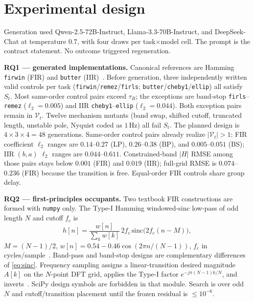 \documentclass{article}
\begin{document}
\section{Experimental design}
\label{sec:design}

Generation used Qwen-2.5-72B-Instruct, Llama-3.3-70B-Instruct,
and DeepSeek-Chat at temperature $0.7$, with four draws per
task$\times$model cell.
The prompt is the contract statement.
No outcome triggered regeneration.

\noindent\textbf{RQ1 --- generated implementations.}
Canonical references are Hamming \texttt{firwin} (FIR) and
\texttt{butter} (IIR)~\cite{virtanen2020scipy}.
Before generation, three independently written valid controls per task
(\texttt{firwin}/\texttt{remez}/\texttt{firls};
\texttt{butter}/\texttt{cheby1}/\texttt{ellip}) all satisfy $S_t$.
Most same-order control pairs exceed $\tau_R$; the exceptions are
band-stop \texttt{firls}--\texttt{remez} ($\ell_2=0.005$) and IIR
\texttt{cheby1}--\texttt{ellip} ($\ell_2=0.044$).
Both exception pairs remain in $\mathcal{V}_t$.
Twelve mechanism mutants (band swap, shifted cutoff, truncated length,
unstable pole, Nyquist coded as $1\,\mathrm{Hz}$) all fail $S_t$.
The planned design is $4\times 3\times 4=48$ generations.
Same-order control pairs already realize $\lvert\mathcal{V}_t\rvert>1$:
FIR coefficient $\ell_2$ ranges are $0.14$--$0.27$ (LP),
$0.26$--$0.38$ (BP), and $0.005$--$0.051$ (BS); IIR
$(b,a)$ $\ell_2$ ranges are $0.044$--$0.611$.
Constrained-band $\lvert H\rvert$ RMSE among those pairs stays
below $0.001$ (FIR) and $0.019$ (IIR); full-grid RMSE is
$0.074$--$0.236$ (FIR) because the transition is free.
Equal-order FIR controls share group delay.

\noindent\textbf{RQ2 --- first-principles occupants.}
Two textbook FIR constructions are formed with \texttt{numpy} only.
The Type-I Hamming windowed-sinc low-pass of odd length $N$ and cutoff
$f_c$ is
\begin{equation}
h[n]=\frac{w[n]}{\sum_k w[k]}\,
2f_c\,\mathrm{sinc}\!\bigl(2f_c(n-M)\bigr),
\label{eq:sinc}
\end{equation}
$M=(N-1)/2$, $w[n]=0.54-0.46\cos(2\pi n/(N-1))$,
$f_c$ in cycles/sample~\cite{kaiser1974window,harris1978windows}.
Band-pass and band-stop designs are complementary differences of
\eqref{eq:sinc}.
Frequency sampling assigns a linear-transition desired magnitude
$A[k]$ on the $N$-point DFT grid, applies the Type-I factor
$e^{-j\pi(N-1)k/N}$, and inverts~\cite{rabiner1970freqsamp}.
SciPy design symbols are forbidden in that module.
Search is over odd $N$ and cutoff/transition placement until the
frozen residual is $\le 10^{-6}$.
\end{document}
